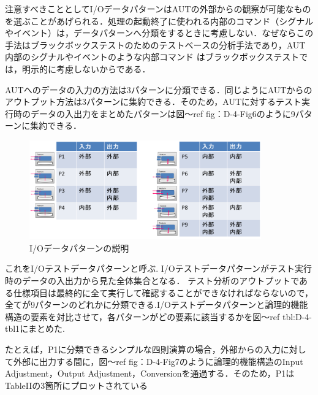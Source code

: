 \documentclass[a4paper,11pt]{jreport}
\begin{document}
注意すべきこととしてI/OデータパターンはAUTの外部からの観察が可能なものを選ぶことがあげられる．処理の起動終了に使われる内部のコマンド（シグナルやイベント）は，データパターンへ分類をするときに考慮しない．なぜならこの手法はブラックボックステストのためのテストベースの分析手法であり，AUT内部のシグナルやイベントのような内部コマンド はブラックボックステストでは，明示的に考慮しないからである．

AUTへのデータの入力の方法は3パターンに分類できる．同じようにAUTからのアウトプット方法は3パターンに集約できる．そのため，AUTに対するテスト実行時のデータの入出力をまとめたパターンは図〜ref {fig：D-4-Fig6}のように9パターンに集約できる．
    \begin{figure}[htbp]
  \begin{center}
  \includegraphics[width=10cm]{./image/D-3-Fig5.png}
  \caption{I/Oデータパターンの説明}
  \label{fig:D-4-Fig6}
  \end{center}
   \end{figure}

これをI/Oテストデータパターンと呼ぶ.
I/Oテストデータパターンがテスト実行時のデータの入出力から見た全体集合となる．
テスト分析のアウトプットである仕様項目は最終的に全て実行して確認することができなければならないので，全てが9パターンのどれかに分類できる.I/Oテストデータパターンと論理的機能構造の要素を対比させて，各パターンがどの要素に該当するかを図〜ref {tbl:D-4-tbl1}にまとめた.


たとえば，P1に分類できるシンプルな四則演算の場合，外部からの入力に対して外部に出力する間に，図〜ref {fig：D-4-Fig7}のように論理的機能構造のInput Adjustment，Output Adjustment，Conversionを通過する．そのため，P1はTableIIの3箇所にプロットされている
\end{document}
